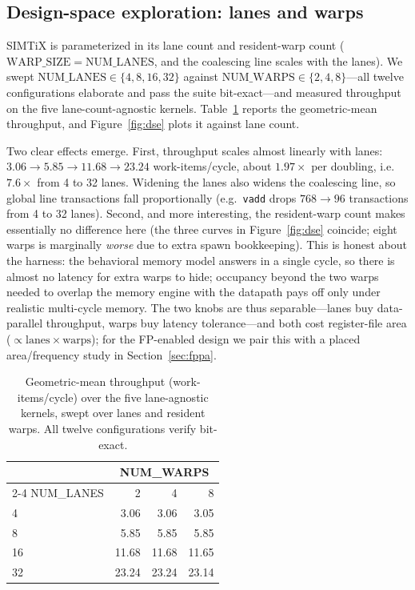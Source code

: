 \documentclass[conference]{IEEEtran}
\begin{document}
\subsection{Design-space exploration: lanes and warps}\label{sec:dse}
SIMTiX is parameterized in its lane count and resident-warp count
($\mathrm{WARP\_SIZE}=\mathrm{NUM\_LANES}$, and the coalescing line scales with
the lanes). We swept $\mathrm{NUM\_LANES}\in\{4,8,16,32\}$ against
$\mathrm{NUM\_WARPS}\in\{2,4,8\}$---all twelve configurations elaborate and pass
the suite bit-exact---and measured throughput on the five lane-count-agnostic
kernels. Table~\ref{tab:dse} reports the geometric-mean throughput, and
Figure~\ref{fig:dse} plots it against lane count.

Two clear effects emerge. First, throughput scales almost linearly with lanes:
$3.06\rightarrow5.85\rightarrow11.68\rightarrow23.24$ work-items/cycle, about
$1.97\times$ per doubling, i.e.\ $7.6\times$ from 4 to 32 lanes. Widening the
lanes also widens the coalescing line, so global line transactions fall
proportionally (e.g.\ \texttt{vadd} drops $768\rightarrow96$ transactions from 4
to 32 lanes). Second, and more interesting, the resident-warp count makes
essentially no difference here (the three curves in Figure~\ref{fig:dse}
coincide; eight warps is marginally \emph{worse} due to extra spawn bookkeeping).
This is honest about the harness: the behavioral memory model answers in a single
cycle, so there is almost no latency for extra warps to hide; occupancy beyond
the two warps needed to overlap the memory engine with the datapath pays off only
under realistic multi-cycle memory. The two knobs are thus separable---lanes buy
data-parallel throughput, warps buy latency tolerance---and both cost register-file
area ($\propto\!\mathrm{lanes}\times\mathrm{warps}$); for the FP-enabled design we
pair this with a placed area/frequency study in Section~\ref{sec:fppa}.

\begin{table}[t]
\caption{Geometric-mean throughput (work-items/cycle) over the five
lane-agnostic kernels, swept over lanes and resident warps. All twelve
configurations verify bit-exact.}
\label{tab:dse}
\centering
\footnotesize
\begin{tabular}{lrrr}
\toprule
& \multicolumn{3}{c}{NUM\_WARPS}\\
\cmidrule(lr){2-4}
NUM\_LANES & 2 & 4 & 8\\
\midrule
4  & 3.06  & 3.06  & 3.05\\
8  & 5.85  & 5.85  & 5.85\\
16 & 11.68 & 11.68 & 11.65\\
32 & 23.24 & 23.24 & 23.14\\
\bottomrule
\end{tabular}
\end{table}
\end{document}
